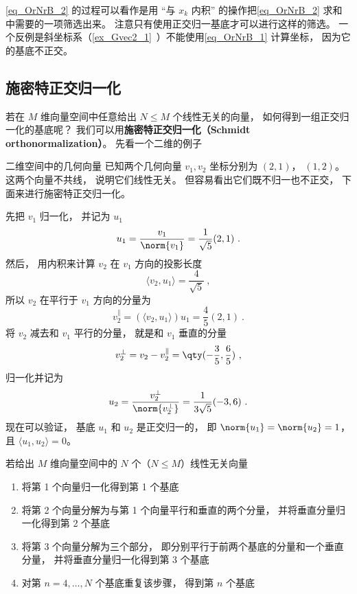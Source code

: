 \autoref{eq_OrNrB_2} 的过程可以看作是用 “与 $x_k$ 内积” 的操作把\autoref{eq_OrNrB_2} 求和中需要的一项筛选出来。 注意只有使用正交归一基底才可以进行这样的筛选。 一个反例是斜坐标系（\autoref{ex_Gvec2_1}~）不能使用\autoref{eq_OrNrB_1} 计算坐标， 因为它的基底不正交。


\subsection{施密特正交归一化}\label{sub_OrNrB_1}


若在 $M$ 维向量空间中任意给出 $N \leqslant M$ 个线性无关的向量， 如何得到一组正交归一化的基底呢？ 我们可以用\textbf{施密特正交归一化（Schmidt orthonormalization）}。 先看一个二维的例子

\begin{example}{二维空间中的几何向量}
已知两个几何向量 $v_1, v_2$ 坐标分别为 $(2, 1)$， $(1, 2)$。 这两个向量不共线， 说明它们线性无关。 但容易看出它们既不归一也不正交， 下面来进行施密特正交归一化。

先把 $v_1$ 归一化， 并记为 $u_1$
\begin{equation}
u_1 = \frac{v_1}{\norm{v_1}} = \frac{1}{\sqrt{5}} (2, 1)~.
\end{equation}
然后， 用内积来计算 $v_2$ 在 $v_1$ 方向的投影长度
\begin{equation}
\langle v_2, u_1 \rangle = \frac{4}{\sqrt{5}}~,
\end{equation}
所以 $v_2$ 在平行于 $v_1$ 方向的分量为
\begin{equation}
v_2^\parallel = (\langle v_2, u_1 \rangle)u_1 = \frac{4}{5} (2, 1)~.
\end{equation}
将 $v_2$ 减去和 $v_1$ 平行的分量， 就是和 $v_1$ 垂直的分量
\begin{equation}
v_2^\bot = v_2 - v_2^\parallel = \qty(-\frac35, \frac65)~,
\end{equation}
归一化并记为
\begin{equation}
u_2 = \frac{v_2^\bot}{\norm{v_2^\bot}} = \frac{1}{3\sqrt{5}} (-3, 6)~.
\end{equation}
现在可以验证， 基底 $u_1$ 和 $u_2$ 是正交归一的， 即 $\norm{u_1} = \norm{u_2} = 1$， 且 $\langle u_1, u_2 \rangle = 0$。
\end{example}

若给出 $M$ 维向量空间中的 $N$ 个（$N \leqslant M$）线性无关向量
\begin{enumerate}
\item 将第 1 个向量归一化得到第 1 个基底
\item 将第 2 个向量分解为与第 1 个向量平行和垂直的两个分量， 并将垂直分量归一化得到第 2 个基底
\item 将第 3 个向量分解为三个部分， 即分别平行于前两个基底的分量和一个垂直分量， 并将垂直分量归一化得到第 3 个基底
\item 对第 $n = 4, \dots , N$ 个基底重复该步骤， 得到第 $n$ 个基底
\end{enumerate}

